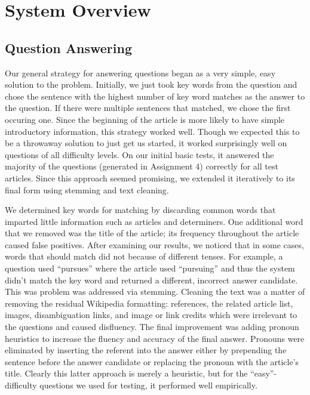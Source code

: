 \documentclass[11pt]{article}
\begin{document}
\section{System Overview}

\subsection{Question Answering}

Our general strategy for answering questions began as a very simple, easy
solution to the problem. Initially, we just took key words from the question and
chose the sentence with the highest number of key word matches as the answer to
the question. If there were multiple sentences that matched, we chose the first
occuring one. Since the beginning of the article is more likely to have simple
introductory information, this strategy worked well. Though we expected this to
be a throwaway solution to just get us started, it worked surprisingly well on
questions of all difficulty levels. On our initial basic tests, it answered the
majority of the questions (generated in Assignment 4) correctly for all test
articles. Since this approach seemed promising, we extended it iteratively to
its final form using stemming and text cleaning.

We determined key words for matching by discarding common words that imparted
little information such as articles and determiners. One additional word that we
removed was the title of the article; its frequency throughout the article
caused false positives. After examining our results, we noticed that in some
cases, words that should match did not because of different tenses. For example,
a question used ``pursues'' where the article used ``pursuing'' and thus the
system didn't match the key word and returned a different, incorrect answer
candidate. This was problem was addressed via stemming. Cleaning the text was a
matter of removing the residual Wikipedia formatting: references, the related
article list, images, disambiguation links, and image or link credits which were
irrelevant to the questions and caused disfluency. The final improvement was
adding pronoun heuristics to increase the fluency and accuracy of the final
answer. Pronouns were eliminated by inserting the referent into the answer
either by prepending the sentence before the answer candidate or replacing the
pronoun with the article's title. Clearly this latter approach is merely a
heuristic, but for the ``easy''-difficulty questions we used for testing, it
performed well empirically.
\end{document}
